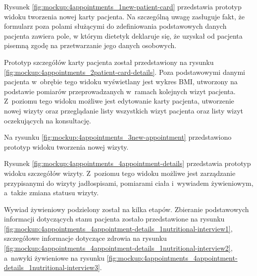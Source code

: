 
Rysunek \ref{fig:mockup:4appointments_1new-patient-card} przedstawia prototyp widoku tworzenia nowej karty pacjenta.
Na szczególną uwagę zasługuje fakt, że formularz poza polami służącymi do zdefiniowania podstawowych danych pacjenta zawiera pole,
w którym dietetyk deklaruje się, że uzyskał od pacjenta pisemną zgodę na przetwarzanie jego danych osobowych.


Prototyp szczegółów karty pacjenta został przedstawiony na rysunku \ref{fig:mockup:4appointments_2patient-card-details}.
Poza podstawowymi danymi pacjenta w~obrębie tego widoku wyświetlany jest wykres BMI, utworzony na podstawie pomiarów przeprowadzanych w~ramach kolejnych wizyt pacjenta.
Z~poziomu tego widoku możliwe jest edytowanie karty pacjenta, utworzenie nowej wizyty oraz przeglądanie listy wszystkich wizyt pacjenta oraz listy wizyt oczekujących na konsultację.


Na rysunku \ref{fig:mockup:4appointments_3new-appointment} przedstawiono prototyp widoku tworzenia nowej wizyty.


Rysunek \ref{fig:mockup:4appointments_4appointment-details} przedstawia prototyp widoku szczegółów wizyty.
Z~poziomu tego widoku możliwe jest zarządzanie przypisanymi do wizyty jadłospisami, pomiarami ciała i~wywiadem żywieniowym, a~także zmiana statusu wizyty.


Wywiad żywieniowy podzielony został na kilka etapów. Zbieranie podstawowych informacji dotyczących stanu pacjenta zostało przedstawione na rysunku \ref{fig:mockup:4appointments_4appointment-details_1nutritional-interview1},
szczegółowe informacje dotyczące zdrowia na rysunku \ref{fig:mockup:4appointments_4appointment-details_1nutritional-interview2}, a~nawyki żywieniowe na rysunku \ref{fig:mockup:4appointments_4appointment-details_1nutritional-interview3}.

